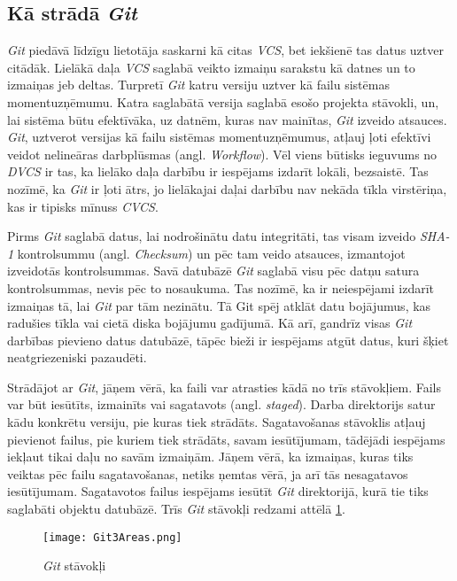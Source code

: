 \subsection{Kā strādā  \textit{Git}}
 \textit{Git} piedāvā līdzīgu lietotāja saskarni kā citas  \textit{VCS}, bet iekšienē tas datus uztver citādāk. Lielākā daļa  \textit{VCS} saglabā veikto izmaiņu sarakstu kā datnes un to izmaiņas jeb deltas.
Turpretī  \textit{Git} katru versiju uztver kā failu sistēmas momentuzņēmumu. Katra saglabātā versija saglabā esošo projekta stāvokli, un, lai sistēma būtu efektīvāka, uz datnēm, kuras nav mainītas,  \textit{Git} izveido atsauces.  \textit{Git}, uztverot versijas kā failu sistēmas momentuzņēmumus, atļauj ļoti efektīvi veidot nelineāras darbplūsmas (angl. \textit{Workflow}).
Vēl viens būtisks ieguvums no  \textit{DVCS} ir tas, ka lielāko daļa darbību ir iespējams izdarīt lokāli, bezsaistē. Tas nozīmē, ka  \textit{Git} ir ļoti ātrs, jo lielākajai daļai darbību nav nekāda tīkla virstēriņa, kas ir tipisks mīnuss \textit{CVCS}.

Pirms \textit{Git} saglabā datus, lai nodrošinātu datu integritāti, tas visam izveido \textit{SHA-1} kontrolsummu (angl. \textit{Checksum}) un pēc tam veido atsauces, izmantojot izveidotās kontrolsummas. Savā datubāzē \textit{Git} saglabā visu pēc datņu satura kontrolsummas, nevis pēc to nosaukuma. Tas nozīmē, ka ir neiespējami izdarīt izmaiņas tā, lai \textit{Git} par tām nezinātu. Tā Git spēj atklāt datu bojājumus, kas radušies tīkla vai cietā diska bojājumu gadījumā. Kā arī, gandrīz visas \textit{Git} darbības pievieno datus datubāzē, tāpēc bieži ir iespējams atgūt datus, kuri šķiet neatgriezeniski pazaudēti.

Strādājot ar \textit{Git}, jāņem vērā, ka faili var atrasties kādā no trīs stāvokļiem. Fails var būt iesūtīts, izmainīts vai sagatavots (angl. \textit{staged}). Darba direktorijs satur kādu konkrētu versiju, pie kuras tiek strādāts. Sagatavošanas stāvoklis atļauj pievienot failus, pie kuriem tiek strādāts, savam iesūtījumam, tādējādi iespējams iekļaut tikai daļu no savām izmaiņām. Jāņem vērā, ka izmaiņas, kuras tiks veiktas pēc failu sagatavošanas, netiks ņemtas vērā, ja arī tās nesagatavos iesūtījumam. Sagatavotos failus iespējams iesūtīt \textit{Git} direktorijā, kurā tie tiks saglabāti objektu datubāzē.
Trīs \textit{Git} stāvokļi redzami attēlā \ref{fig:Git3Areas}. \cite[Git Basics]{chacon2014progit}
\begin{figure}[H]%
	\centering
	\captionsetup{justification=centering}
	\texttt{[image: Git3Areas.png]}
	\caption{\textit{Git} stāvokļi}
	\label{fig:Git3Areas}
\end{figure}


